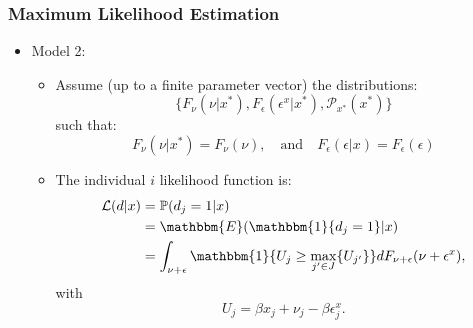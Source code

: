 \documentclass[10pt,letterpaper]{beamer}
\begin{document}
\begin{frame}
\frametitle{Maximum Likelihood Estimation}

\begin{itemize}
	\item Model 2:
	\begin{itemize}
		\item Assume (up to a finite parameter vector) the distributions: 
		\begin{equation*}
		\{F_{\nu}(\nu|x^{*}), F_{\epsilon}(\epsilon^{x}|x^{*}), \mathcal{P}_{x^{*}}(x^{*})\}
		\end{equation*}
		such that:
		\begin{equation*}
		F_{\nu}(\nu|x^{*})=F_{\nu}(\nu),\quad\text{and}\quad F_{\epsilon}(\epsilon|x)=F_{\epsilon}(\epsilon)
		\end{equation*}
		\item The individual $i$ likelihood function is:
		\begin{equation*}
		\begin{split}
		\mathcal{L}(d|x)&=\mathbb{P}(d_{j}=1|x)\\
		&=\mathbbm{E}(\mathbbm{1}\{d_{j}=1\}|x)\\
		&=\int_{\nu+\epsilon}\mathbbm{1}\{U_{j}\geq\max_{j'\in J}\{U_{j'}\}\}dF_{\nu+\epsilon}(\nu+\epsilon^{x}),\\
		\end{split}
		\end{equation*}
		with
		\begin{equation*}
		U_{j}=\beta x_{j}+\nu_{j}-\beta\epsilon^{x}_{j}.
		\end{equation*}
	\end{itemize}
\end{itemize}
\end{frame}		
\end{document}
